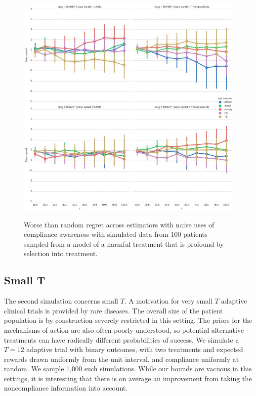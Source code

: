 \begin{figure}
	\centering	
	\includegraphics[width=1\columnwidth]{bandit/figs/ex2.jpeg}\hspace{1cm}
	\label{fig:ex2}
	\caption{Worse than random regret across estimators with naive uses of compliance awareness with simulated data from 100 patients sampled from a model of a harmful treatment that is profound by selection into treatment.}
\end{figure}



\subsection{Small T}

The second simulation concerns small $T$. A motivation for very small $T$ adaptive clinical trials is provided by rare diseases. The overall size of the patient population is by construction severely restricted in this setting.  The priors for the mechanisms of action are also often poorly understood, so potential alternative treatments can have radically different probabilities of success. We simulate a $T=12$ adaptive trial with binary outcomes, with two treatments and expected rewards drawn uniformly from the unit interval, and compliance uniformly at random. We sample 1,000 such simulations.
While our bounds are vacuous in this settings, it is interesting that there is on average an  improvement from taking the noncompliance information into account.


